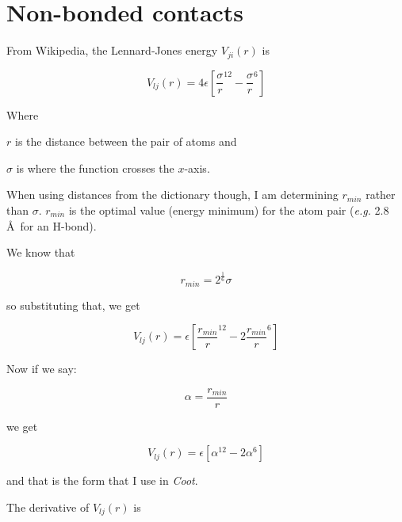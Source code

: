 \documentclass{article}
\begin{document}
\section{Non-bonded contacts}


From Wikipedia, the Lennard-Jones energy $V_{\mathit{ji}}(r)$ is

\begin{equation}
  \label{eq:1}
  V_{\mathit{lj}}(r) = 4 \epsilon \left[ \frac{\sigma}{r}^{\mathit{12}} - \frac{\sigma}{r}^{6} \right]
\end{equation}

Where

\begin{trivlist}
\item $r$ is the distance between the pair of atoms and
\item $\sigma$ is where the function crosses the $x$-axis.
\end{trivlist}

When using distances from the dictionary though, I am determining $r_{\mathit{min}}$ rather than $\sigma$.
$r_{\mathit{min}}$ is the optimal value (energy minimum) for the atom pair (\emph{e.g.} 2.8 \AA\ for an H-bond).

We know that

\begin{equation}
  \label{eq:2}
  r_{\mathit{min}} = 2^{\frac{1}{6}} \sigma
\end{equation}

so substituting that, we get 

\begin{equation}
  \label{eq:3}
  V_{\mathit{lj}}(r) = \epsilon \left[ \frac{r_{\mathit{min}}}{r}^{\mathit{12}} - 2 \frac{r_{\mathit{min}}}{r}^{6} \right]
\end{equation}

Now if we say:

\begin{equation}
  \label{eq:4}
  \alpha = \frac{r_{\mathit{min}}}{r}
\end{equation}

we get

\begin{equation}
  \label{eq:3}
  V_{\mathit{lj}}(r) = \epsilon \left[ \alpha^{\mathit{12}} - 2 \alpha^{6} \right]
\end{equation}

and that is the form that I use in \emph{Coot}.

The derivative of $V_{\mathit{lj}}(r)$ is
\end{document}
